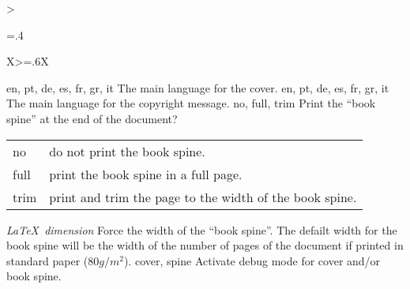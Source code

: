 \begin{xltabular}{\linewidth}{>{\hsize=.4\hsize\raggedright\arraybackslash}X>{\hsize=.6\hsize}X}
  \midrule
  {en, pt, de, es, fr, gr, it}%
  {The main language for the cover.}%
  {%
  }
  \midrule
  {en, pt, de, es, fr, gr, it}%
  {The main language for the copyright message.}%
  {%
  }
  \midrule
  {no, full, trim}%
  {Print the “book spine” at the end of the document?}%
  {%
    \begin{tabular}{@{}l@{ $\rightarrow$ }X@{}}
      no   & do not print the book spine.                            \\
      full & print the book spine in a full page.                    \\
      trim & print and trim the page to the width of the book spine. \\
    \end{tabular}
  }
  \midrule
  {\emph{\LaTeX\ dimension}}%
  {Force the width of the “book spine”.}%
  {%
    The defailt width for the book spine will be the width of the number of pages of the document if printed in standard paper ($80g/m^2$).
  }
  \midrule
  {cover, spine}%
  {Activate debug mode for cover and/or book spine.}%
  {%
  }

\end{xltabular}
